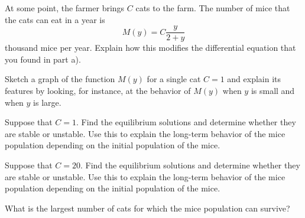 \begin{exercises}
    \item At some point, the farmer brings $C$ cats to the farm.  The
    number of mice that the cats can eat in a year is
    $$M(y) = C\frac{y}{2+y}$$
    thousand mice per year.  Explain how this modifies the
    differential equation that you found in part a).

    \item
     Sketch a graph of the function $M(y)$ for a single cat $C=1$ and
    explain its features by looking, for instance, at the behavior of
    $M(y)$ when $y$ is small and when $y$ is large.

    \item Suppose that $C=1$.  Find the equilibrium solutions and
    determine whether they are stable or unstable.  Use this to
    explain the long-term behavior of the mice population depending on
    the initial population of the mice.

   \item Suppose that $C=20$.  Find the equilibrium solutions and
    determine whether they are stable or unstable.  Use this to
    explain the long-term behavior of the mice population depending on
    the initial population of the mice.

    \item  What is the largest number of cats for which the mice
    population can survive?

\ea


    
        
\end{exercises}
\afterexercises
